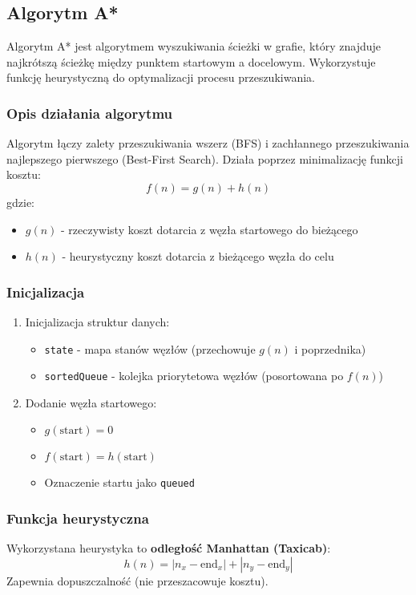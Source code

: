 \documentclass[../../../../doc.tex]{subfiles}
\begin{document}
\subsection{Algorytm A*}

Algorytm A* jest algorytmem wyszukiwania ścieżki w grafie, który znajduje najkrótszą ścieżkę między punktem startowym a docelowym. Wykorzystuje funkcję heurystyczną do optymalizacji procesu przeszukiwania.

\subsubsection{Opis działania algorytmu}

Algorytm łączy zalety przeszukiwania wszerz (BFS) i zachłannego przeszukiwania najlepszego pierwszego (Best-First Search). Działa poprzez minimalizację funkcji kosztu:
\[
  f(n) = g(n) + h(n)
\]
gdzie:
\begin{itemize}
  \item $g(n)$ - rzeczywisty koszt dotarcia z węzła startowego do bieżącego
  \item $h(n)$ - heurystyczny koszt dotarcia z bieżącego węzła do celu
\end{itemize}

\subsubsection{Inicjalizacja}
\begin{enumerate}
  \item Inicjalizacja struktur danych:
        \begin{itemize}
          \item \texttt{state} - mapa stanów węzłów (przechowuje $g(n)$ i poprzednika)
          \item \texttt{sortedQueue} - kolejka priorytetowa węzłów (posortowana po $f(n)$)
        \end{itemize}
  \item Dodanie węzła startowego:
        \begin{itemize}
          \item $g(\text{start}) = 0$
          \item $f(\text{start}) = h(\text{start})$
          \item Oznaczenie startu jako \texttt{queued}
        \end{itemize}
\end{enumerate}

\subsubsection{Funkcja heurystyczna}
Wykorzystana heurystyka to \textbf{odległość Manhattan (Taxicab)}:
\[
  h(n) = |n_x - \text{end}_x| + |n_y - \text{end}_y|
\]
Zapewnia dopuszczalność (nie przeszacowuje kosztu).
\end{document}
